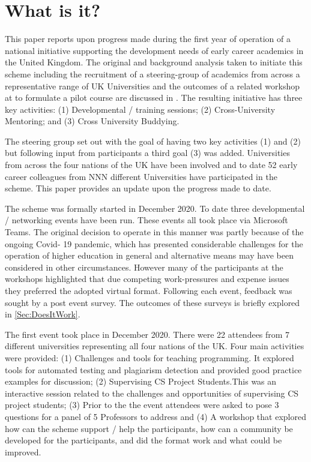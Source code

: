 \documentclass[sigconf]{acmart}
\begin{document}
\section{What is it?}	
\label{sec:What}
This paper reports upon progress made during the first year of operation of a national initiative supporting the development needs of early career academics in the United Kingdom. The original and background analysis taken to initiate this scheme including the recruitment of a steering-group of academics from across a representative range of UK Universities and the outcomes of a related workshop at  to formulate a pilot course are discussed in . The resulting initiative has three key activities: (1) Developmental / training sessions; (2) Cross-University Mentoring; and (3) Cross University Buddying.

The steering group set out with the goal of having two key activities (1) and (2) but following input from participants a third goal (3) was added. Universities from across the four nations of the UK have been involved and to date 52 early career colleagues from NNN different Universities have participated in the scheme. This paper provides an update upon the progress made to date.

The scheme was formally started in December 2020. To date three developmental / networking events have been run. These events all took place via Microsoft Teams. The original decision to operate in this manner was partly because of the ongoing Covid- 19 pandemic, which has presented considerable challenges for the operation of higher education in general \cite{CrickCovidUK} and alternative means may have been considered in other circumstances. However many of the participants at the workshops highlighted that due competing work-pressures and expense issues they preferred the adopted virtual format. Following each event, feedback was sought by a post event survey. The outcomes of these surveys is briefly explored in \ref{Sec:DoesItWork}. 

The first event took place in December 2020. There were 22 attendees from 7 different universities representing all four nations of the UK. Four main activities were provided: (1) Challenges and tools for teaching programming. It explored tools for automated testing and plagiarism detection and provided good practice examples for discussion; (2) Supervising CS Project Students.This was an interactive session related to the challenges and opportunities of supervising CS project students; (3) Prior to the the event attendees were asked to pose 3 questions for a panel of 5 Professors to address and (4) A workshop that explored how can the scheme support / help the participants, how can a community be developed for the participants, and did the format work and what could be improved.
\end{document}
